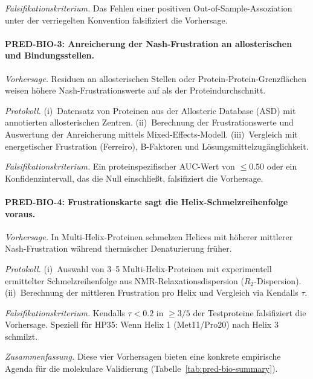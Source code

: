 \documentclass[12pt,a4paper]{article}
\theoremstyle{remark}
\begin{document}
\textit{Falsifikationskriterium.}
Das Fehlen einer positiven Out-of-Sample-Assoziation unter der verriegelten Konvention falsifiziert die Vorhersage.

\paragraph{PRED-BIO-3: Anreicherung der Nash-Frustration an allosterischen und Bindungsstellen.}

\textit{Vorhersage.}
Residuen an allosterischen Stellen oder Protein-Protein-Grenzflächen weisen höhere Nash-Frustrationswerte auf als der Proteindurchschnitt.

\textit{Protokoll.}
(i)~Datensatz von Proteinen aus der Allosteric Database (ASD) mit annotierten allosterischen Zentren.
(ii)~Berechnung der Frustrationswerte und Auswertung der Anreicherung mittels Mixed-Effects-Modell.
(iii)~Vergleich mit energetischer Frustration (Ferreiro), B-Faktoren und Lösungsmittelzugänglichkeit.

\textit{Falsifikationskriterium.}
Ein proteinspezifischer AUC-Wert von $\le 0.50$ oder ein Konfidenzintervall, das die Null einschließt, falsifiziert die Vorhersage.

\paragraph{PRED-BIO-4: Frustrationskarte sagt die Helix-Schmelzreihenfolge voraus.}

\textit{Vorhersage.}
In Multi-Helix-Proteinen schmelzen Helices mit höherer mittlerer Nash-Frustration während thermischer Denaturierung früher.

\textit{Protokoll.}
(i)~Auswahl von 3--5 Multi-Helix-Proteinen mit experimentell ermittelter Schmelzreihenfolge aus NMR-Relaxationsdispersion ($R_2$-Dispersion).
(ii)~Berechnung der mittleren Frustration pro Helix und Vergleich via Kendalls $\tau$.

\textit{Falsifikationskriterium.}
Kendalls $\tau < 0.2$ in $\ge 3/5$ der Testproteine falsifiziert die Vorhersage. Speziell für HP35: Wenn Helix 1 (Met11/Pro20) nach Helix 3 schmilzt.

\medskip

\noindent\textit{Zusammenfassung.} Diese vier Vorhersagen bieten eine konkrete empirische Agenda für die molekulare Validierung (Tabelle~\ref{tab:pred-bio-summary}).
\end{document}
